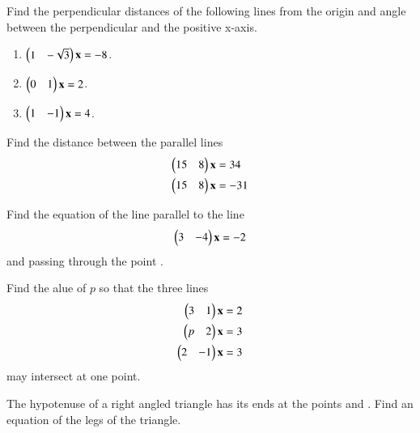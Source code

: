 \item Find the perpendicular distances of the following lines from the origin and angle between the perpendicular and the positive x-axis.
\begin{enumerate}
\item $\begin{pmatrix}1 & -\sqrt{3}\end{pmatrix}\mathbf{x} = -8$.
\item $\begin{pmatrix}0 & 1\end{pmatrix}\mathbf{x} = 2$.
\item $\begin{pmatrix}1 & -1\end{pmatrix}\mathbf{x} = 4$.
\end{enumerate}
\item Find the distance between the parallel lines
%
\begin{align}
\begin{pmatrix}15 & 8\end{pmatrix}\mathbf{x} &= 34
\\
\begin{pmatrix}15 & 8\end{pmatrix}\mathbf{x} &= -31
\end{align}
%
\solution


\item Find the equation of the line parallel to the line 
\begin{align}
\begin{pmatrix}3 & -4\end{pmatrix}\mathbf{x} = -2
\end{align}
%
and passing through the point .
\item Find the alue of $p$ so that the three lines 
%
\begin{align}
\begin{pmatrix}3 & 1\end{pmatrix}\mathbf{x} &= 2
\\
\begin{pmatrix}p & 2\end{pmatrix}\mathbf{x} &= 3
\\
\begin{pmatrix}2 & -1\end{pmatrix}\mathbf{x} &= 3
\end{align}
%
may intersect at one point.
%
%
\item The hypotenuse of a right angled triangle has its ends at the points  and . Find an equation of the legs of the triangle.

